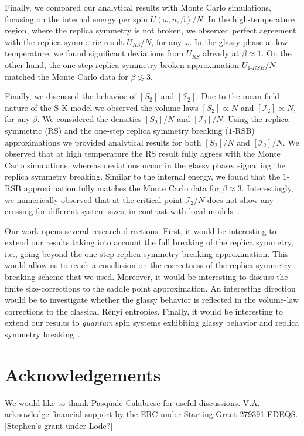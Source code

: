 \documentclass[twocolumn,superscriptaddress,prb,10pt]{revtex4-1}
\begin{document}
Finally, we compared our analytical results with Monte Carlo simulations, focusing on the 
internal energy per spin $U(\omega,n,\beta)/N$. In the high-temperature region, where the 
replica symmetry is not broken, we observed perfect agreement with the replica-symmetric 
result $U_{RS}/N$, for any $\omega$. In the glassy phase at low temperature, we found 
significant deviations from $U_{RS}$ already at $\beta\approx 1$. On the other hand,  
the one-step replica-symmetry-broken approximation $U_{1\textrm{-}RSB}/N$ matched the 
Monte Carlo data for $\beta\lesssim 3$. 

Finally, we discussed the behavior of $[S_2]$ and $[{\mathcal I}_2]$. Due to the mean-field 
nature of the S-K model we observed the volume laws $[S_2]\propto N$ and 
$[{\mathcal I}_2]\propto N$, for any $\beta$. We considered the densities 
$[S_2]/N$ and $[{\mathcal I}_2]/N$. Using the replica-symmetric (RS) and the one-step 
replica symmetry breaking ($1$-RSB) approximations we provided analytical results for 
both $[S_2]/N$ and $[{\mathcal I}_2]/N$. We observed that at high temperature the 
RS result fully agrees with the Monte Carlo simulations, whereas deviations occur in the 
glassy phase, signalling the replica symmetry breaking. Similar to the internal energy, 
we found that the $1$-RSB approximation fully matches the Monte Carlo data for $\beta\approx 3$.
Interestingly, we numerically observed that at the critical point ${\mathcal I}_2/N$ 
does not show any crossing for different system sizes, in contrast with local 
models~\cite{jaconis-2013}.

Our work opens several research directions. First, it would be interesting to extend our 
results taking into account the full breaking of the replica symmetry, i.e., going beyond 
the one-step replica symmetry breaking approximation. This would allow us to reach a conclusion 
on the correctness of the replica symmetry breaking scheme that we used. Moreover, it 
would be interesting to discuss the finite size-corrections to the saddle 
point approximation. An interesting direction would be to investigate whether the 
glassy behavior is reflected in the volume-law corrections to the classical R\'enyi 
entropies. Finally, it would be interesting to extend our results to {\it quantum} spin 
systems exhibiting glassy behavior and replica symmetry breaking~\cite{read-1995,
andreanov-2012}. 

\section{Acknowledgements}
We would like to thank Pasquale Calabrese for useful discussions. V.A.  acknowledge 
financial support by the ERC under Starting Grant 279391 EDEQS. 
[Stephen's grant under Lode?]
\end{document}

